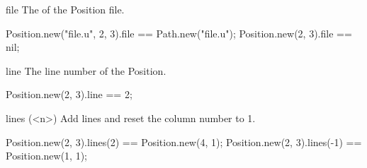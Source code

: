 \begin{urbiscriptapi}
\item[file]
  The  of the Position file.
\begin{urbiassert}
Position.new("file.u", 2, 3).file == Path.new("file.u");
Position.new(2, 3).file == nil;
\end{urbiassert}


\item[line]
  The line number of the Position.
\begin{urbiassert}
Position.new(2, 3).line == 2;
\end{urbiassert}


\item[lines](<n>)%
  Add  lines and reset the column number to 1.
\begin{urbiassert}
Position.new(2, 3).lines(2)  == Position.new(4, 1);
Position.new(2, 3).lines(-1) == Position.new(1, 1);
\end{urbiassert}
\end{urbiscriptapi}


